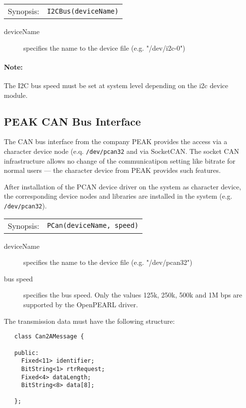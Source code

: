 \begin{tabular}{ll}
Synopsis: & \verb|I2CBus(deviceName)|\\ 
\end{tabular}

\begin{description}
\item[deviceName] specifies the name to the device file (e.g. "/dev/i2c-0")
\end{description}

\paragraph{Note:}
The I2C bus speed must be set at system level depending on the 
i2c device module.


\subsection{PEAK CAN Bus Interface}
The CAN bus interface from the company PEAK provides the access via a character 
device node (e.q. \texttt{/dev/pcan32} and via SocketCAN.
The socket CAN infrastructure allows no change of the communicatipon setting
like bitrate for normal users --- the character device from PEAK provides
such features.

After installation of the PCAN device driver on the system as character 
device, the corresponding device nodes and libraries are installed 
in the system (e.g. \verb|/dev/pcan32|).


\begin{tabular}{ll}
Synopsis: & \verb|PCan(deviceName, speed)|\\ 
\end{tabular}

\begin{description}
\item[deviceName] specifies the name to the device file (e.g. "/dev/pcan32")
\item[bus speed] specifies the bus speed. 
Only the values 125k, 250k, 500k and 1M bps are supported by 
the OpenPEARL driver.
\end{description}

The transmission data must have the following structure:

\begin{verbatim}
   class Can2AMessage {

   public:
     Fixed<11> identifier;
     BitString<1> rtrRequest;
     Fixed<4> dataLength;
     BitString<8> data[8];

   };
\end{verbatim}




